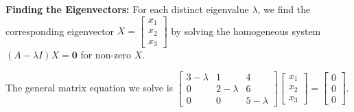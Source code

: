 \documentclass{article}
\begin{document}
\textbf{Finding the Eigenvectors:}
For each distinct eigenvalue $\lambda$, we find the corresponding eigenvector $X = \begin{bmatrix} x_1 \\ x_2 \\ x_3 \end{bmatrix}$ by solving the homogeneous system $(A - \lambda I) X = \mathbf{0}$ for non-zero $X$.

The general matrix equation we solve is $\begin{bmatrix} 3 - \lambda & 1 & 4 \\ 0 & 2 - \lambda & 6 \\ 0 & 0 & 5 - \lambda \end{bmatrix} \begin{bmatrix} x_1 \\ x_2 \\ x_3 \end{bmatrix} = \begin{bmatrix} 0 \\ 0 \\ 0 \end{bmatrix}$.
\end{document}

